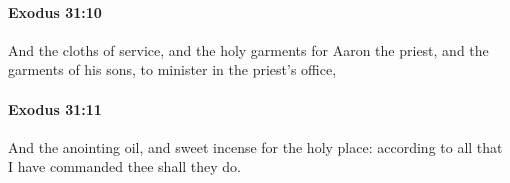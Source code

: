 		\paragraph{Exodus 31:10} %
			\label{EXODUS-31-10}

			And the cloths of service, and the holy garments for Aaron the priest, and the garments of his sons, to minister in the priest's office,


		\paragraph{Exodus 31:11} %
			\label{EXODUS-31-11}

			And the anointing oil, and sweet incense for the holy place: according to all that I have commanded thee shall they do.


